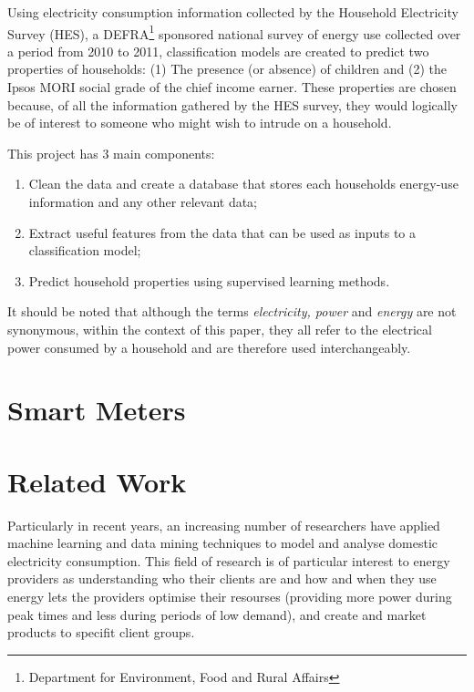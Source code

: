 Using electricity consumption information collected by the Household Electricity Survey (HES), a DEFRA\footnote{Department for Environment, Food and Rural Affairs} sponsored national survey of energy use collected over a period from 2010 to 2011, classification models are created to predict two properties of households: (1) The presence (or absence) of children and (2) the Ipsos MORI social grade of the chief income earner. These properties are chosen because, of all the information gathered by the HES survey, they would logically be of interest to someone who might wish to intrude on a household.
\newline

This project has 3 main components:

\begin{enumerate}
\item Clean the data and create a database that stores each households energy-use information and any other relevant data;
\item Extract useful features from the data that can be used as inputs to a classification model; 
\item Predict household properties using supervised learning methods.
\end{enumerate}

It should be noted that although the terms \textit{electricity, power} and \textit{energy} are not synonymous, within the context of this paper, they all refer to the electrical power consumed by a household and are therefore used interchangeably. 


\section{Smart Meters}
\section{Related Work}
\label{sec:previousWork}
Particularly in recent years, an increasing number of researchers have applied machine learning and data mining techniques to  model and analyse domestic electricity consumption. This field of research is of particular interest to energy providers as understanding who their clients are and how and when they use energy lets the providers optimise their resourses (providing more power during peak times and less during periods of low demand), and create and market products to specifit client groups. 


